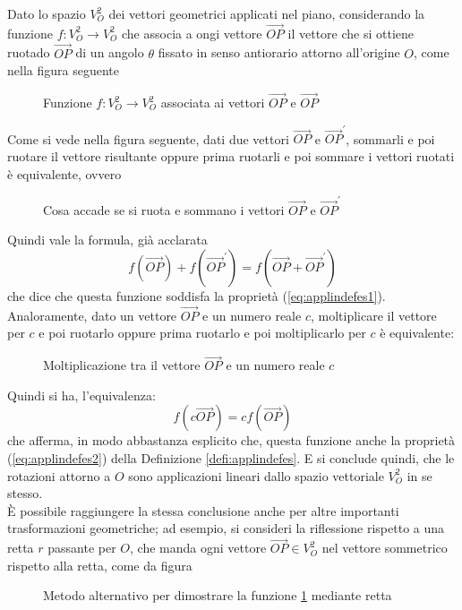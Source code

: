 \begin{es}
  \label{es:applindefes1}
  Dato lo spazio $V_O^2$ dei vettori geometrici applicati nel piano,
  considerando la funzione $f:V_O^2\to V_O^2$ che associa a ongi vettore
  $\vec{OP}$ il vettore che si ottiene ruotado $\vec{OP}$ di un angolo
  $\theta$ fissato in senso antiorario attorno all'origine $O$, come
  nella figura seguente
  \begin{figure}[ht!]
    \centering
    \resizebox{4cm}{!}{}
    \caption{Funzione $f:V_O^2\to V_O^2$ associata ai vettori $\vec{OP}$ e $\vec{OP}$}
    \label{fig:applindefes1}
  \end{figure}
  
  Come si vede nella figura seguente, dati due vettori $\vec{OP}$ e
  $\vec{OP}^\prime$, sommarli e poi ruotare il vettore risultante oppure
  prima ruotarli e poi sommare i vettori ruotati è equivalente, ovvero
  \clearpage
  \begin{figure}[ht!]
    \centering
    \resizebox{7cm}{!}{}
    \caption{Cosa accade se si ruota e sommano i vettori $\vec{OP}$ e $\vec{OP}^\prime$}
    \label{fig:applindefes2}
  \end{figure}
  Quindi vale la formula, già acclarata
  \begin{equation}
    \label{eq:applindefes3}
    f(\vec{OP})+f(\vec{OP}^\prime)=f(\vec{OP}+\vec{OP}^\prime)
  \end{equation}
  che dice che questa funzione soddisfa la proprietà
  (\ref{eq:applindefes1}). Analoramente, dato un vettore $\vec{OP}$ e un
  numero reale $c$, moltiplicare il vettore per $c$ e poi ruotarlo oppure
  prima ruotarlo e poi moltiplicarlo per $c$ è equivalente:
  \begin{figure}[ht!]
    \centering
    \resizebox{5cm}{!}{}
    \caption{Moltiplicazione tra il vettore $\vec{OP}$ e un numero reale $c$}
    \label{fig:applindefes3}
  \end{figure}
  
  Quindi si ha, l'equivalenza:
  \begin{equation}
    \label{eq:applindefes4}
    f(c\vec{OP})=cf(\vec{OP})
  \end{equation}
  che afferma, in modo abbastanza esplicito che, questa funzione anche
  la proprietà (\ref{eq:applindefes2}) della Definizione
  \ref{defi:applindefes}. E si conclude quindi, che le rotazioni attorno
  a $O$ sono applicazioni lineari dallo spazio vettoriale $V_O^2$ in se
  stesso.\\
  È possibile raggiungere la stessa conclusione anche per altre importanti
  trasformazioni geometriche; ad esempio, si consideri la riflessione
  rispetto a una retta $r$ passante per $O$, che manda ogni vettore
  $\vec{OP}\in V_O^2$ nel vettore sommetrico rispetto alla retta, come
  da figura
  \begin{figure}[ht!]
    \centering
    \resizebox{5cm}{!}{}
    \caption{Metodo alternativo per dimostrare la funzione
      \ref{fig:applindefes1} mediante retta}
    \label{fig:applindefes4}
  \end{figure}


\end{es}
